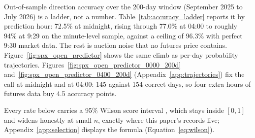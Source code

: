 \label{sec:results}

Out-of-sample direction accuracy over the 200-day window (September 2025 to
July 2026) is a ladder, not a number. Table~\ref{tab:accuracy_ladder} reports
it by prediction hour: 72.5\% at midnight, rising through 77.0\% at 04:00 to
roughly 94\% at 9:29 on the minute-level sample, against a ceiling of 96.3\%
with perfect 9:30 market data. The rest is auction noise that no futures
price contains. Figure~\ref{fig:spx_open_predictor} shows the same climb as
per-day probability trajectories.
Figures~\ref{fig:spx_open_predictor_0000_200d}
and~\ref{fig:spx_open_predictor_0400_200d} (Appendix~\ref{app:trajectories})
fix the call at midnight and at
04:00: 145 against 154 correct days, so four extra hours of futures data buy
4.5 accuracy points.

Every rate below carries a 95\% Wilson score interval \citep{wilson1927},
which stays inside $[0,1]$ and widens honestly at small $n$, exactly where
this paper's records live; Appendix~\ref{app:selection} displays the
formula (Equation~\ref{eq:wilson}).

